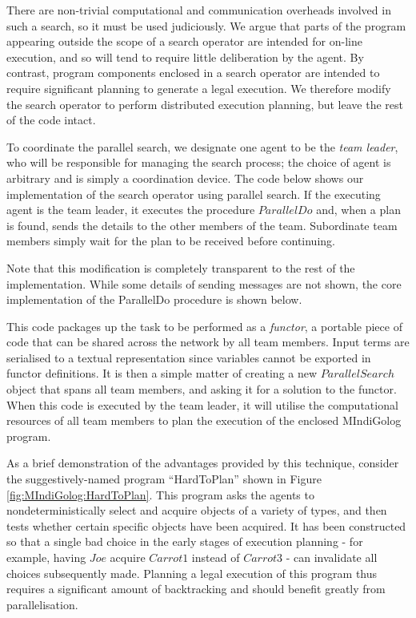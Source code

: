 There are non-trivial computational and communication overheads involved
in such a search, so it must be used judiciously. We argue that parts
of the program appearing outside the scope of a search operator are
intended for on-line execution, and so will tend to require little
deliberation by the agent. By contrast, program components enclosed
in a search operator are intended to require significant planning
to generate a legal execution. We therefore modify the search operator
to perform distributed execution planning, but leave the rest of the
code intact.

To coordinate the parallel search, we designate one agent to be the
\emph{team leader}, who will be responsible for managing the search
process; the choice of agent is arbitrary and is simply a coordination
device. The code below shows our implementation of the search operator
using parallel search. If the executing agent is the team leader,
it executes the procedure $ParallelDo$ and, when a plan is found,
sends the details to the other members of the team. Subordinate team
members simply wait for the plan to be received before continuing.


Note that this modification is completely transparent to the rest
of the implementation. While some details of sending messages are
not shown, the core implementation of the ParallelDo procedure is
shown below.


This code packages up the task to be performed as a \emph{functor},
a portable piece of code that can be shared across the network by
all team members. Input terms are serialised to a textual representation
since variables cannot be exported in functor definitions. It is then
a simple matter of creating a new $ParallelSearch$ object that spans
all team members, and asking it for a solution to the functor. When
this code is executed by the team leader, it will utilise the computational
resources of all team members to plan the execution of the enclosed
MIndiGolog program.

As a brief demonstration of the advantages provided by this technique,
consider the suggestively-named program {}``HardToPlan'' shown in
Figure \ref{fig:MIndiGolog:HardToPlan}. This program asks the agents
to nondeterministically select and acquire objects of a variety of
types, and then tests whether certain specific objects have been acquired.
It has been constructed so that a single bad choice in the early stages
of execution planning - for example, having $Joe$ acquire $Carrot1$
instead of $Carrot3$ - can invalidate all choices subsequently made.
Planning a legal execution of this program thus requires a significant
amount of backtracking and should benefit greatly from parallelisation.

